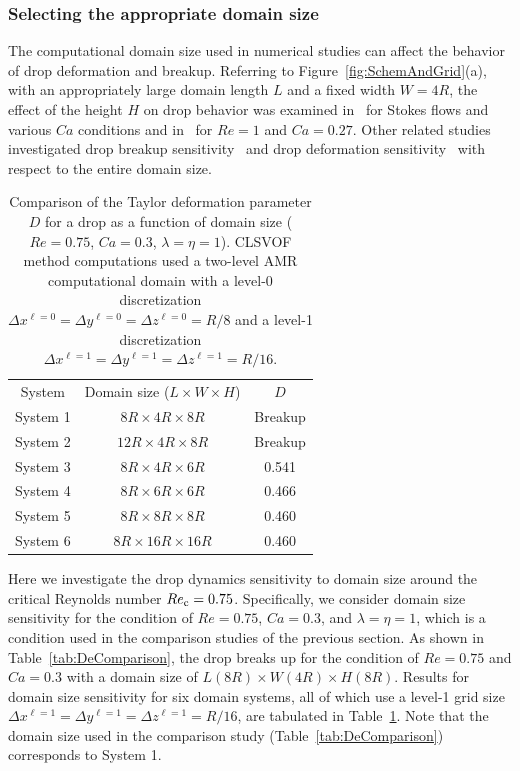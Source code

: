 \documentclass[%
 reprint,
 showkeys,
 amsmath,amssymb,
 aps,
 prfluids,
 onecolumn
]{revtex4-2}
\newcommand{\LWH}{L\times W \times H}
\newcommand{\lwh}[3]{L(#1R)\times W(#2R) \times H(#3R)}
\begin{document}
\subsubsection{Selecting the appropriate domain size}

The computational domain size used in numerical studies can affect the behavior
of drop deformation and breakup.  Referring to
Figure~\ref{fig:SchemAndGrid}(a), with an appropriately large domain length $L$
and a fixed width $W=4R$, the effect of the height $H$ on drop behavior was
examined in~\cite{LiRenRen00} for Stokes flows and various $Ca$ conditions and
in~\cite{KomShaEskDer14} for $Re=1$ and $Ca=0.27$.  Other related studies
investigated drop breakup sensitivity~\cite{RenCri01-1} and drop deformation
sensitivity~\cite{RenCriLi02} with respect to the entire domain size.
%
\begin{table}[tbh]
\caption{Comparison of the Taylor deformation parameter {\color{red} $D$} for a drop as a function of
         domain size ($Re=0.75$, $Ca=0.3$, $\lambda = \eta = 1$).
         CLSVOF method computations used a two-level AMR computational domain 
         with a level-0 discretization $\Delta x^{\ell=0} = \Delta y^{\ell=0} 
         = \Delta z^{\ell=0} = R/8$ and a level-1 discretization
         $\Delta x^{\ell=1} = \Delta y^{\ell=1} = \Delta z^{\ell=1} = R/16$.}
\label{tab:DomComparison}
\center
\begin{tabular}{ c  c  c}
\hline
\hline
System      & Domain size ($\LWH$)         & {\color{red} $D$}    \\
System 1    & $8R  \times 4R  \times 8R$   & Breakup \\
System 2    & $12R \times 4R  \times 8R$   & Breakup \\
System 3    & $8R  \times 4R  \times 6R$   & 0.541   \\
System 4    & $8R  \times 6R  \times 6R$   & 0.466   \\
System 5    & $8R  \times 8R  \times 8R$   & 0.460   \\
System 6    & $8R  \times 16R \times 16R$  & 0.460   \\
\hline
\hline
\end{tabular}
\end{table}
%

Here we investigate the drop dynamics sensitivity to domain size around the
critical Reynolds number $Re_{\rm c}=0.75$.  Specifically, we consider domain size
sensitivity for the condition of $Re=0.75$, $Ca=0.3$, and $\lambda = \eta = 1$,
which is a condition used in the comparison studies of the previous section.
As shown in Table~\ref{tab:DeComparison}, the drop breaks up for the condition
of $Re=0.75$ and $Ca=0.3$ with a domain size of $\lwh{8}{4}{8}$.  Results for
domain size sensitivity for six domain systems, all of which use a level-1 grid
size $\Delta x^{\ell=1} = \Delta y^{\ell=1}= \Delta z^{\ell=1} = R/16$, are
tabulated in Table~\ref{tab:DomComparison}. Note that the domain size used in
the comparison study (Table~\ref{tab:DeComparison}) corresponds to System 1.
\end{document}
